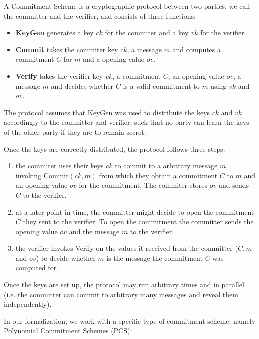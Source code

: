 \begin{definition}
    \label{CS}
    A Commitment Scheme is a cryptographic protocol between two parties, we call the committer and the verifier, and consists of three functions:
    \begin{itemize}
        \item \textbf{KeyGen} generates a key $ck$ for the commiter and a key $vk$ for the verifier.
        \item \textbf{Commit}
        takes the commiter key $ck$, a message $m$ and computes a commitment $C$ for $m$ and a opening value $ov$. 
        \item \textbf{Verify} 
        takes the verifier key $vk$, a commitment $C$, an opening value $ov$, a message $m$ and decides whether $C$ is a valid commitment to $m$ using $vk$ and $ov$.
    \end{itemize}
    \parencite{thalerbook}

    The protocol assumes that KeyGen was used to distribute the keys $ck$ and $vk$ accordingly to the committer and verifier, such that no party can learn the keys of the other party if they are to remain secret. 

    Once the keys are correctly distributed, the protocol follows three steps: 
    \begin{enumerate}
        \item the commiter uses their keys $ck$ to commit to a arbitrary message $m$, invoking Commit$(ck,m)$ from which they obtain a commitment $C$ to $m$ and an opening value $ov$ for the commitment. The commiter stores $ov$ and sends $C$ to the verifier.
        \item at a later point in time, the committer might decide to open the commitment $C$ they sent to the verifier. To open the commitment the committer sends the opening value $ov$ and the message $m$ to the verifier. 
        \item the verifier invokes Verify on the values it received from the committer ($C,m$ and $ov$) to decide whether $m$ is the message the commitment $C$ was computed for. 
    \end{enumerate}
    Once the keys are set up, the protocol may run arbitrary times and in parallel (i.e. the committer can commit to arbitrary many messages and reveal them independently).
\end{definition}

In our formalization, we work with a specific type of commitment scheme, namely Polynomial Commitment Schemes (PCS): 

